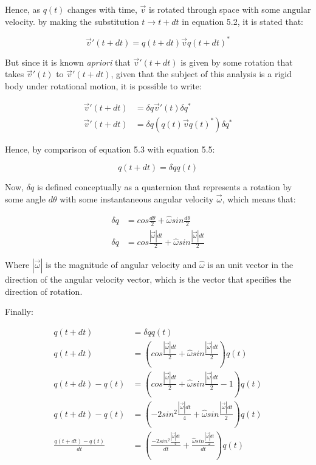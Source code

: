\indent
	Hence, as $q(t)$ changes with time, $\vec{v}$ is rotated through space with some angular velocity. by making the substitution $t \rightarrow t + dt$ in equation 5.2, it is stated that:

\begin{equation}
	\vec{v}'(t+dt) = q(t+dt)\vec{v} q(t+dt)^*
\end{equation}

\indent
	But since it is known \textit{apriori} that $\vec{v}'(t + dt)$ is given by some rotation that takes $\vec{v}'(t)$ to $\vec{v}'(t + dt)$, given that the subject of this analysis is a rigid body under rotational motion, it is possible to write:

\begin{align}
	\vec{v}'(t + dt) &= \delta q \vec{v}'(t) \delta q^* \\
	\vec{v}'(t + dt) &= \delta q( q(t) \vec{v} q(t)^* ) \delta q^*
\end{align}

\indent 
	Hence, by comparison of equation 5.3 with equation 5.5:

\begin{equation}
	q(t + dt) = \delta q q(t)
\end{equation}

\indent
	Now, $\delta q$ is defined conceptually as a quaternion that represents a rotation by some angle $d\theta$ with some instantaneous angular velocity $\vec{\omega}$, which means that:

\begin{align}
	\delta q &= cos\frac{d\theta}{2} + \hat{\omega}sin\frac{d\theta}{2} \\
	\delta q &= cos\frac{| \vec{\omega} |dt}{2} + \hat{\omega}sin\frac{|\vec{\omega}|dt}{2}
\end{align}

\indent
	Where $|\vec{\omega}|$ is the magnitude of angular velocity and $\hat{\omega}$ is an unit vector in the direction of the angular velocity vector, which is the vector that specifies the direction of rotation.

\indent
	Finally:

\begin{align}
	q(t + dt) &= \delta q q(t) \\
	q(t + dt) &= (cos\frac{|\vec{\omega}|dt}{2} + \hat{\omega}sin\frac{|\vec{\omega}|dt}{2})q(t) \\	
	q(t + dt) - q(t) &= (cos\frac{|\vec{\omega}|dt}{2} + \hat{\omega}sin\frac{|\vec{\omega}|dt}{2} - 1)q(t) \\
	q(t + dt) - q(t) &= (-2sin^2\frac{|\vec{\omega}|dt}{4} + \hat{\omega}sin\frac{|\vec{\omega}|dt}{2})q(t) \\
	\frac{q(t + dt) - q(t)}{dt} &= \left(\frac{-2sin^2\frac{|\vec{\omega}|dt}{4}}{dt} + \frac{\hat{\omega}sin\frac{|\vec{\omega}|dt}{2}}{dt}\right)q(t) 
\end{align}

